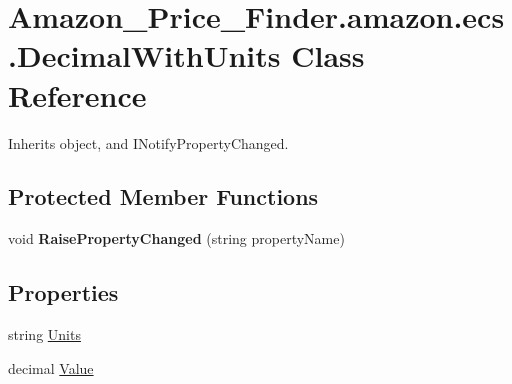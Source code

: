 \hypertarget{class_amazon___price___finder_1_1amazon_1_1ecs_1_1_decimal_with_units}{\section{Amazon\-\_\-\-Price\-\_\-\-Finder.\-amazon.\-ecs.\-Decimal\-With\-Units Class Reference}
\label{class_amazon___price___finder_1_1amazon_1_1ecs_1_1_decimal_with_units}
}


 




Inherits object, and I\-Notify\-Property\-Changed.

\subsection*{Protected Member Functions}
\begin{DoxyCompactItemize}
\item 
\hypertarget{class_amazon___price___finder_1_1amazon_1_1ecs_1_1_decimal_with_units_ab65443e8283cd57bf3dabc519015bf0e}{void {\bfseries Raise\-Property\-Changed} (string property\-Name)}\label{class_amazon___price___finder_1_1amazon_1_1ecs_1_1_decimal_with_units_ab65443e8283cd57bf3dabc519015bf0e}

\end{DoxyCompactItemize}
\subsection*{Properties}
\begin{DoxyCompactItemize}
\item 
\hypertarget{class_amazon___price___finder_1_1amazon_1_1ecs_1_1_decimal_with_units_adefa9d971f3c27a9f25485c9de3790e9}{string \hyperlink{class_amazon___price___finder_1_1amazon_1_1ecs_1_1_decimal_with_units_adefa9d971f3c27a9f25485c9de3790e9}{Units}}\label{class_amazon___price___finder_1_1amazon_1_1ecs_1_1_decimal_with_units_adefa9d971f3c27a9f25485c9de3790e9}

\begin{DoxyCompactList}\small\item\em \end{DoxyCompactList}\item 
\hypertarget{class_amazon___price___finder_1_1amazon_1_1ecs_1_1_decimal_with_units_a03bc04a7e40bb9edbec78f1c5a77f4bd}{decimal \hyperlink{class_amazon___price___finder_1_1amazon_1_1ecs_1_1_decimal_with_units_a03bc04a7e40bb9edbec78f1c5a77f4bd}{Value}}\label{class_amazon___price___finder_1_1amazon_1_1ecs_1_1_decimal_with_units_a03bc04a7e40bb9edbec78f1c5a77f4bd}

\begin{DoxyCompactList}\small\item\em \end{DoxyCompactList}\end{DoxyCompactItemize}

